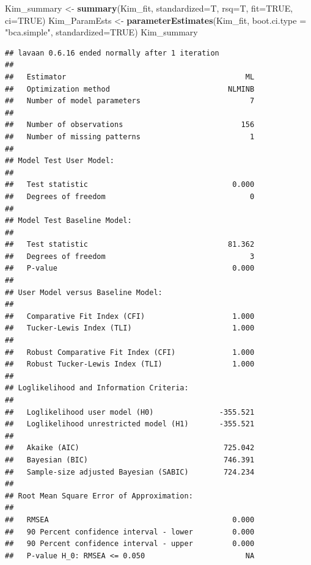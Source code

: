 \documentclass[
  11pt,
]{book}
\newenvironment{Shaded}{\begin{snugshade}}{\end{snugshade}}
\newcommand{\AttributeTok}[1]{\textcolor[rgb]{0.27,0.27,0.27}{#1}}
\newcommand{\ConstantTok}[1]{\textcolor[rgb]{0.37,0.37,0.37}{#1}}
\newcommand{\FunctionTok}[1]{\textcolor[rgb]{0.27,0.27,0.27}{\textbf{#1}}}
\newcommand{\NormalTok}[1]{#1}
\newcommand{\OtherTok}[1]{\textcolor[rgb]{0.37,0.37,0.37}{#1}}
\newcommand{\StringTok}[1]{\textcolor[rgb]{0.5,0.5,0.5}{#1}}
\begin{document}
\begin{Shaded}
\begin{Highlighting}[]
\NormalTok{Kim\_summary }\OtherTok{\textless{}{-}} \FunctionTok{summary}\NormalTok{(Kim\_fit, }\AttributeTok{standardized=}\NormalTok{T, }\AttributeTok{rsq=}\NormalTok{T, }\AttributeTok{fit=}\ConstantTok{TRUE}\NormalTok{, }\AttributeTok{ci=}\ConstantTok{TRUE}\NormalTok{)}
\NormalTok{Kim\_ParamEsts }\OtherTok{\textless{}{-}} \FunctionTok{parameterEstimates}\NormalTok{(Kim\_fit, }\AttributeTok{boot.ci.type =} \StringTok{"bca.simple"}\NormalTok{, }\AttributeTok{standardized=}\ConstantTok{TRUE}\NormalTok{)}
\NormalTok{Kim\_summary}
\end{Highlighting}
\end{Shaded}

\begin{verbatim}
## lavaan 0.6.16 ended normally after 1 iteration
## 
##   Estimator                                         ML
##   Optimization method                           NLMINB
##   Number of model parameters                         7
## 
##   Number of observations                           156
##   Number of missing patterns                         1
## 
## Model Test User Model:
##                                                       
##   Test statistic                                 0.000
##   Degrees of freedom                                 0
## 
## Model Test Baseline Model:
## 
##   Test statistic                                81.362
##   Degrees of freedom                                 3
##   P-value                                        0.000
## 
## User Model versus Baseline Model:
## 
##   Comparative Fit Index (CFI)                    1.000
##   Tucker-Lewis Index (TLI)                       1.000
##                                                       
##   Robust Comparative Fit Index (CFI)             1.000
##   Robust Tucker-Lewis Index (TLI)                1.000
## 
## Loglikelihood and Information Criteria:
## 
##   Loglikelihood user model (H0)               -355.521
##   Loglikelihood unrestricted model (H1)       -355.521
##                                                       
##   Akaike (AIC)                                 725.042
##   Bayesian (BIC)                               746.391
##   Sample-size adjusted Bayesian (SABIC)        724.234
## 
## Root Mean Square Error of Approximation:
## 
##   RMSEA                                          0.000
##   90 Percent confidence interval - lower         0.000
##   90 Percent confidence interval - upper         0.000
##   P-value H_0: RMSEA <= 0.050                       NA

\end{verbatim}
\end{document}
